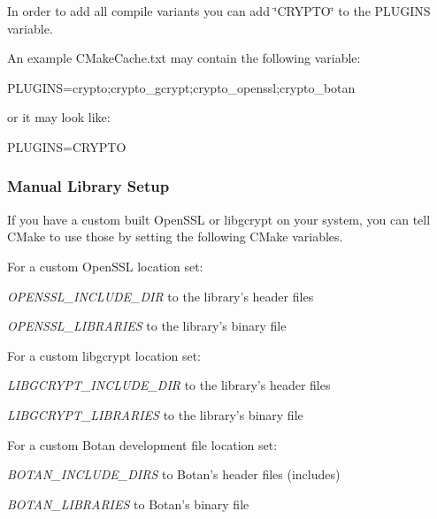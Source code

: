 In order to add all compile variants you can add \char`\"{}\+C\+R\+Y\+P\+T\+O\char`\"{} to the {\ttfamily P\+L\+U\+G\+I\+N\+S} variable.

An example {\ttfamily C\+Make\+Cache.\+txt} may contain the following variable\+: \begin{DoxyVerb}PLUGINS=crypto;crypto_gcrypt;crypto_openssl;crypto_botan
\end{DoxyVerb}


or it may look like\+: \begin{DoxyVerb}PLUGINS=CRYPTO
\end{DoxyVerb}


\subsubsection*{Manual Library Setup}

If you have a custom built Open\+S\+S\+L or libgcrypt on your system, you can tell C\+Make to use those by setting the following C\+Make variables.

For a custom Open\+S\+S\+L location set\+:


\begin{DoxyItemize}
\item {\itshape O\+P\+E\+N\+S\+S\+L\+\_\+\+I\+N\+C\+L\+U\+D\+E\+\_\+\+D\+I\+R} to the library's header files
\item {\itshape O\+P\+E\+N\+S\+S\+L\+\_\+\+L\+I\+B\+R\+A\+R\+I\+E\+S} to the library's binary file
\end{DoxyItemize}

For a custom libgcrypt location set\+:


\begin{DoxyItemize}
\item {\itshape L\+I\+B\+G\+C\+R\+Y\+P\+T\+\_\+\+I\+N\+C\+L\+U\+D\+E\+\_\+\+D\+I\+R} to the library's header files
\item {\itshape L\+I\+B\+G\+C\+R\+Y\+P\+T\+\_\+\+L\+I\+B\+R\+A\+R\+I\+E\+S} to the library's binary file
\end{DoxyItemize}

For a custom Botan development file location set\+:


\begin{DoxyItemize}
\item {\itshape B\+O\+T\+A\+N\+\_\+\+I\+N\+C\+L\+U\+D\+E\+\_\+\+D\+I\+R\+S} to Botan's header files (includes)
\item {\itshape B\+O\+T\+A\+N\+\_\+\+L\+I\+B\+R\+A\+R\+I\+E\+S} to Botan's binary file
\end{DoxyItemize}

